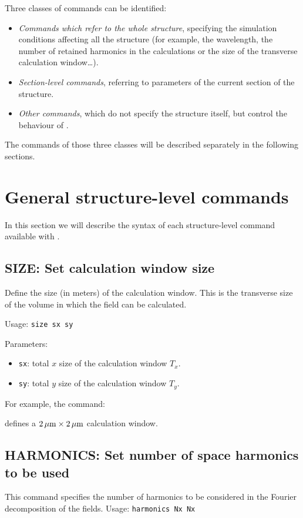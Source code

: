 Three classes of commands can be identified:
\begin{itemize}
\item \textit{Commands which refer to the whole structure}, specifying the simulation conditions affecting all the structure (for example, the wavelength, the number of retained harmonics in the calculations or the size of the transverse calculation window\dots).
\item \textit{Section-level commands}, referring to parameters of the current section of the structure.
\item \textit{Other commands}, which do not specify the structure itself, but control the behaviour of \afmm.
\end{itemize}
The commands of those three classes will be described separately in the following sections.

\section{General structure-level commands}
In this section we will describe the syntax of each structure-level command available with \afmm.

\subsection{SIZE: Set calculation window size}
\label{subsec_size}
Define the size (in meters) of the calculation window. This is the transverse size of the  volume in which the field can be calculated.
 
Usage: \lstinline!size sx sy!
    
Parameters:
\begin{itemize}
\item \lstinline!sx!: total $x$ size of the calculation window $T_x$.
\item \lstinline!sy!: total $y$ size of the calculation window $T_y$.
\end{itemize}

For example, the command:

defines a $2\,\mathrm{\mu m}\times 2\,\mathrm{\mu m}$ calculation window.

\subsection{HARMONICS: Set number of space harmonics to be used}
\label{subsec_harmonics}
This command specifies the number of harmonics to be considered in the Fourier decomposition of the fields.
Usage: \lstinline!harmonics Nx Nx!
    
